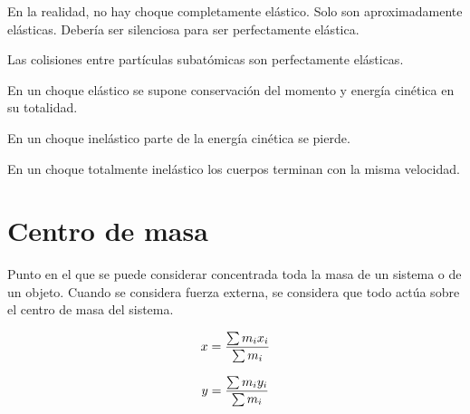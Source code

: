 \documentclass[12pt]{article}
\begin{document}
En la realidad,
no hay choque completamente elástico.
Solo son aproximadamente elásticas.
Debería ser silenciosa para ser perfectamente elástica.

Las colisiones entre partículas subatómicas son perfectamente elásticas.

En un choque elástico se supone conservación del momento y energía cinética 
en su totalidad.

En un choque inelástico parte de la energía cinética se pierde.

En un choque totalmente inelástico los cuerpos terminan con la misma velocidad.

\section{Centro de masa}

Punto en el que se puede considerar concentrada toda la masa de un sistema 
o de un objeto.
Cuando se considera fuerza externa, se considera que todo actúa sobre el 
centro de masa del sistema.

\begin{equation}
    x = \frac{\sum m_{i}x_{i}}{\sum m_{i}}\\
\end{equation}

\begin{equation}
    y = \frac{\sum m_{i}y_{i}}{\sum m_{i}}\\
\end{equation}
\end{document}
